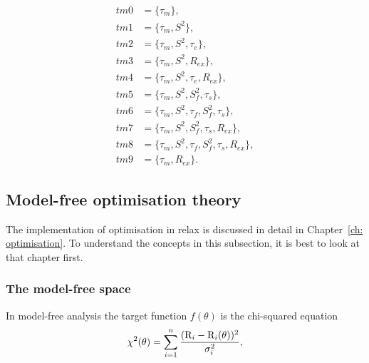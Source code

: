 \begin{htmlonly}
\begin{subequations}
\begin{align}
 tm0 &= \{\tau_m\},                                     \label{model: tm0} \\
 tm1 &= \{\tau_m, S^2\},                                \label{model: tm1} \\
 tm2 &= \{\tau_m, S^2, \tau_e\},                        \label{model: tm2} \\
 tm3 &= \{\tau_m, S^2, R_{ex}\},                        \label{model: tm3} \\
 tm4 &= \{\tau_m, S^2, \tau_e, R_{ex}\},                \label{model: tm4} \\
 tm5 &= \{\tau_m, S^2, S^2_f, \tau_s\},                 \label{model: tm5} \\
 tm6 &= \{\tau_m, S^2, \tau_f, S^2_f, \tau_s\},         \label{model: tm6} \\
 tm7 &= \{\tau_m, S^2, S^2_f, \tau_s, R_{ex}\},         \label{model: tm7} \\
 tm8 &= \{\tau_m, S^2, \tau_f, S^2_f, \tau_s, R_{ex}\}, \label{model: tm8} \\
 tm9 &= \{\tau_m, R_{ex}\}.                             \label{model: tm9}
\end{align}
\end{subequations}
\end{htmlonly}





\subsection{Model-free optimisation theory}

The implementation of optimisation in relax is discussed in detail in Chapter~\ref{ch: optimisation}.
To understand the concepts in this subsection, it is best to look at that chapter first.


\subsubsection{The model-free space}

In model-free analysis the target function $f(\theta)$ is the chi-squared equation
\begin{equation} \label{eq: chi2 mf}
 \chi^2(\theta) = \sum_{i=1}^n \frac{(\mathrm{R}_i - \mathrm{R}_i(\theta))^2}{\sigma_i^2},
\end{equation}

